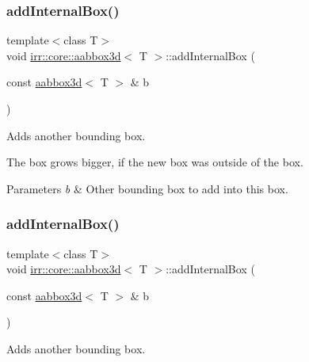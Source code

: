 \subsubsection{\texorpdfstring{add\+Internal\+Box()}{addInternalBox()}\hspace{0.1cm}{\footnotesize\ttfamily [1/2]}}
{\footnotesize\ttfamily template$<$class T$>$ \\
void \hyperlink{classirr_1_1core_1_1aabbox3d}{irr\+::core\+::aabbox3d}$<$ T $>$\+::add\+Internal\+Box (\begin{DoxyParamCaption}\item[{const \hyperlink{classirr_1_1core_1_1aabbox3d}{aabbox3d}$<$ T $>$ \&}]{b }\end{DoxyParamCaption})\hspace{0.3cm}{\ttfamily [inline]}}



Adds another bounding box. 

The box grows bigger, if the new box was outside of the box. 
\begin{DoxyParams}{Parameters}
{\em b} & Other bounding box to add into this box. \\
\hline
\end{DoxyParams}
\mbox{\label{classirr_1_1core_1_1aabbox3d_a7ccc210a3fb0ce82765d28f2047942c5}} 
\subsubsection{\texorpdfstring{add\+Internal\+Box()}{addInternalBox()}\hspace{0.1cm}{\footnotesize\ttfamily [2/2]}}
{\footnotesize\ttfamily template$<$class T$>$ \\
void \hyperlink{classirr_1_1core_1_1aabbox3d}{irr\+::core\+::aabbox3d}$<$ T $>$\+::add\+Internal\+Box (\begin{DoxyParamCaption}\item[{const \hyperlink{classirr_1_1core_1_1aabbox3d}{aabbox3d}$<$ T $>$ \&}]{b }\end{DoxyParamCaption})\hspace{0.3cm}{\ttfamily [inline]}}



Adds another bounding box. 

